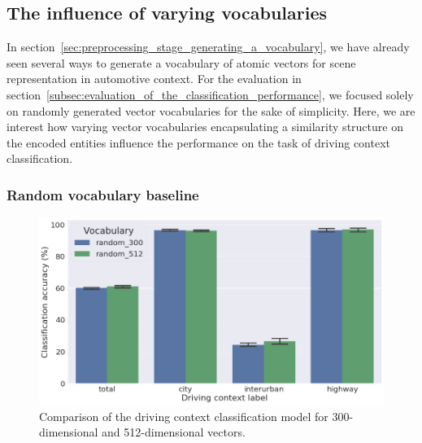 \subsection{The influence of varying vocabularies}%
\label{subsec:the_influence_of_varying_vocabularies}

In section~\ref{sec:preprocessing_stage_generating_a_vocabulary}, we have already seen several ways to generate a vocabulary of atomic vectors for scene representation in automotive context.
For the evaluation in section~\ref{subsec:evaluation_of_the_classification_performance}, we focused solely on randomly generated vector vocabularies for the sake of simplicity.
Here, we are interest how varying vector vocabularies encapsulating a similarity structure on the encoded entities influence the performance on the task of driving context classification.

\subsubsection{Random vocabulary baseline}%
\label{ssubsec:random_vocabulary_baseline}

\begin{figure}[t]
    \centering
    \includegraphics[width=0.9\linewidth]{imgs/context_class_random_512_vs_random_300_dim_vocab.png}
    \caption{Comparison of the driving context classification model for \num{300}-dimensional and \num{512}-dimensional vectors.}
    \label{fig:context_class_random_512_vs_random_300_dim_vocab}
\end{figure}

